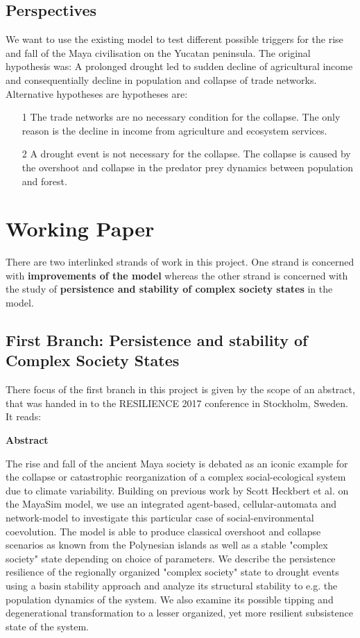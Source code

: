 \subsection{Perspectives}
We want to use the existing model to test different possible triggers for the
rise and fall of the Maya civilisation on the Yucatan peninsula. The original
hypothesis was: A prolonged drought led to sudden decline of agricultural
income and consequentially decline in population and collapse of trade
networks.\\
Alternative hypotheses are hypotheses are:
\begin{itemize}
    \item[1] The trade networks are no necessary condition for the collapse. The
        only reason is the decline in income from agriculture and ecosystem
        services.
    \item[2] A drought event is not necessary for the collapse. The collapse is
        caused by the overshoot and collapse in the predator prey dynamics
        between population and forest.
\end{itemize}

\section{Working Paper}
There are two interlinked strands of work in this project. One strand is concerned with \textbf{improvements of the model} whereas the other strand is concerned with the study of \textbf{persistence and stability of complex society states} in the model.

\subsection{First Branch: Persistence and stability of Complex Society States}
There focus of the first branch in this project is given by the scope of an abstract, that was handed in to the RESILIENCE 2017 conference in Stockholm, Sweden.
It reads:\par
\textbf{Abstract} \par
The rise and fall of the ancient Maya society is debated as an iconic example for the collapse or catastrophic reorganization of a complex social-ecological system due to climate variability.
Building on previous work by Scott Heckbert et al. on the MayaSim model, we use an integrated agent-based, cellular-automata and network-model to investigate this particular case of social-environmental coevolution. The model is able to produce classical overshoot and collapse scenarios as known from the Polynesian islands as well as a stable "complex society" state depending on choice of parameters.
We describe the persistence resilience of the regionally organized "complex society" state to drought events using a basin stability approach and analyze its structural stability to e.g. the population dynamics of the system. We also examine its possible tipping and degenerational transformation to a lesser organized, yet more resilient subsistence state of the system.\par

